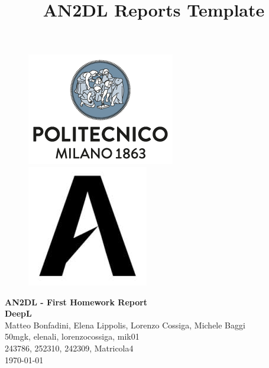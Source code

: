 \documentclass[11pt]{article}
\title{AN2DL Reports Template}
\begin{document}
    
    \begin{figure}[H]
        \raggedright
        \includegraphics[scale=0.4]{polimi.png} \hfill \includegraphics[scale=0.3]{airlab.jpeg}
    \end{figure}
    
    \vspace{5mm}
    
    \begin{center}
        {\Large \textbf{AN2DL - First Homework Report}}\\
        \vspace{2mm}
        {\Large \textbf{DeepL}}\\
        \vspace{2mm}
        {\large Matteo Bonfadini,}
        {\large Elena Lippolis,}
        {\large Lorenzo Cossiga,}
        {\large Michele Baggi}\\
        \vspace{2mm}
        {50mgk,}
        {elenali,}
        {lorenzocossiga,}
        {mik01}\\
        \vspace{2mm}
        {243786,}
        {252310,}
        {242309,}
        {Matricola4}\\
        \vspace{5mm}
        \today
    \end{center}    
    \vspace{5mm}
    
\end{document}
